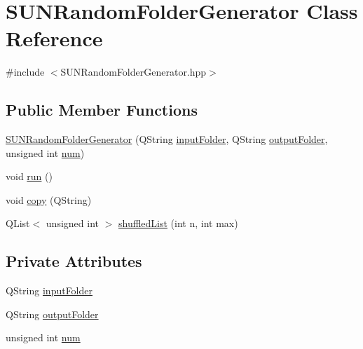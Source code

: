 \hypertarget{class_s_u_n_random_folder_generator}{\section{S\+U\+N\+Random\+Folder\+Generator Class Reference}
\label{class_s_u_n_random_folder_generator}
}


{\ttfamily \#include $<$S\+U\+N\+Random\+Folder\+Generator.\+hpp$>$}

\subsection*{Public Member Functions}
\begin{DoxyCompactItemize}
\item 
\hyperlink{class_s_u_n_random_folder_generator_ace7843ac3121b56fa6942d592cc43215}{S\+U\+N\+Random\+Folder\+Generator} (Q\+String \hyperlink{class_s_u_n_random_folder_generator_a3f9525ed0cca76258f89630fa1b23512}{input\+Folder}, Q\+String \hyperlink{class_s_u_n_random_folder_generator_a3a23fbc7b969530de102838cf9566f3e}{output\+Folder}, unsigned int \hyperlink{class_s_u_n_random_folder_generator_a0fdde54a3c62efd013f0b05c49abd884}{num})
\item 
void \hyperlink{class_s_u_n_random_folder_generator_a768be016f5c824edf5d19eb5a88ab3b8}{run} ()
\item 
void \hyperlink{class_s_u_n_random_folder_generator_a2e06d62fb796eb5222e79a8068593b8d}{copy} (Q\+String)
\item 
Q\+List$<$ unsigned int $>$ \hyperlink{class_s_u_n_random_folder_generator_a515728ee2e168336b2e0e0f72cc86813}{shuffled\+List} (int n, int max)
\end{DoxyCompactItemize}
\subsection*{Private Attributes}
\begin{DoxyCompactItemize}
\item 
Q\+String \hyperlink{class_s_u_n_random_folder_generator_a3f9525ed0cca76258f89630fa1b23512}{input\+Folder}
\item 
Q\+String \hyperlink{class_s_u_n_random_folder_generator_a3a23fbc7b969530de102838cf9566f3e}{output\+Folder}
\item 
unsigned int \hyperlink{class_s_u_n_random_folder_generator_a0fdde54a3c62efd013f0b05c49abd884}{num}
\end{DoxyCompactItemize}


